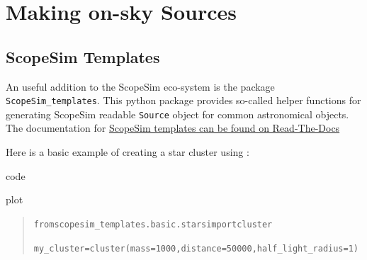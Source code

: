 

\section{Making on-sky Sources%
  \label{making-on-sky-sources}%
}


\subsection{ScopeSim Templates%
  \label{scopesim-templates}%
}

An useful addition to the ScopeSim eco-system is the package \texttt{ScopeSim\_templates}.
This python package provides so-called helper functions for generating ScopeSim readable \texttt{Source} object for common astronomical objects.
The documentation for \href{https://scopesim-templates.readthedocs.io/en/latest/}{ScopeSim templates can be found on Read-The-Docs}

Here is a basic example of creating a star cluster using :

\label{code-scopesim-templates-example}
\begin{DUclass}{code}
\begin{DUclass}{plot}
\begin{quote}
\begin{alltt}
from scopesim_templates.basic.stars import cluster

my_cluster = cluster(mass=1000, distance=50000, half_light_radius=1)
\end{alltt}
\end{quote}
\end{DUclass}
\end{DUclass}


